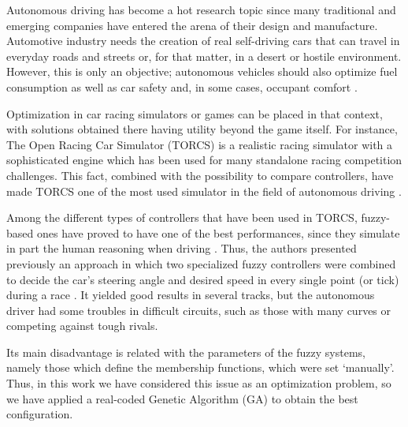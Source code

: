 \documentclass[conference]{IEEEtran}
\begin{document}
Autonomous driving has become a hot research topic since many
traditional and emerging companies have entered the arena of their
design and manufacture. %
Automotive industry
needs the creation of real self-driving cars that can travel in everyday roads and streets or, for
that matter, in a desert or hostile environment. However, this is only an
objective; autonomous vehicles should also optimize fuel consumption as
well as car safety and, in some cases, occupant comfort \cite{Autodriv2006}.  

Optimization in car racing simulators or games 
can be placed in that context, with solutions obtained there having utility beyond the game itself. 
For instance, The Open Racing Car Simulator
(TORCS) \cite{WebTORCS} is a realistic racing simulator with a
sophisticated engine which has been used for many standalone racing competition
challenges. 
This fact, combined with the possibility to compare controllers, 
have made TORCS one of the most used simulator in the field of autonomous driving \cite{LFAG,Guadarrama2008,SAES2012,Floreano2004}.  

Among the different types of controllers that have been used in TORCS, 
fuzzy-based ones have proved to have one of the best performances, since they
simulate in part the human reasoning when driving
\cite{PerezEvolvingFuzzy09,torcs2012}. Thus,
the authors presented previously an approach in which two specialized
fuzzy controllers were combined to decide the car's steering angle and
desired speed in every single point (or tick) during a race
\cite{evo17}. It yielded good results in several tracks, but the autonomous driver had some troubles in difficult circuits, such as those with many curves or competing against tough rivals.

Its main disadvantage is related with the parameters of the fuzzy systems, namely those which define the membership functions, which were set `manually'.
Thus, in this work we have considered this issue as an optimization problem, so we have applied a real-coded Genetic Algorithm (GA) \cite{realcodedGA1998} to obtain the best configuration.
\end{document}
